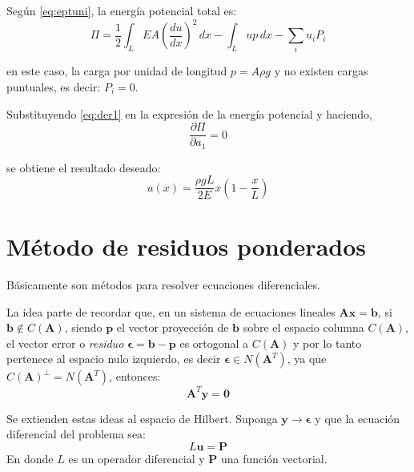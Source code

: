 \begin{example}
	Según \eqref{eq:eptuni}, la energía potencial total es:
	\begin{equation*}
		\Pi = \dfrac{1}{2} \int_L EA \left( \dfrac{du}{dx} \right)^2 \, dx - \int_L up\, dx - \sum_i u_i P_i
	\end{equation*}
	
	en este caso, la carga por unidad de longitud $p = A \rho g$ y no existen cargas puntuales, es decir: $P_i = 0$.
	
	Substituyendo \eqref{eq:der1} en la expresión de la energía potencial y haciendo,
	\begin{equation*}
		\dfrac{\partial \Pi}{\partial a_1} = 0 
	\end{equation*}
	
	
	se obtiene el resultado deseado:
	\begin{equation}
		u(x) = \dfrac{\rho g L}{2E} x \left(1 - \dfrac{x}{L}\right)
		\label{eq:rr2}
	\end{equation}
\end{example}

\section{Método de residuos ponderados}

Básicamente son métodos para resolver ecuaciones diferenciales.

La idea parte de recordar que, en un sistema de ecuaciones lineales $\mathbf{Ax} = \mathbf{b}$, si $\mathbf{b} \not \in C(\mathbf{A})$, siendo $\mathbf{p}$ el vector proyección de $\mathbf{b}$ sobre el espacio columna $C(\mathbf{A})$, el vector error o \textit{residuo} $\bm{\epsilon} = \mathbf{b} - \mathbf{p}$ es ortogonal a $C(\mathbf{A})$ y por lo tanto pertenece al espacio nulo izquierdo, es decir $\bm{\epsilon} \in N(\mathbf{A}^T)$, ya que $C(\mathbf{A})^{\perp} = N(\mathbf{A}^T)$, entonces:
\begin{equation}
	\mathbf{A}^T \mathbf{y} = \mathbf{0}
	\label{eq:residuo}
\end{equation}

Se extienden estas ideas al espacio de Hilbert. Suponga $\mathbf{y} \rightarrow \bm{\epsilon}$ y que la ecuación diferencial del problema sea:
\begin{equation}
	L \mathbf{u} = \mathbf{P}
	\label{eq:LuP}
\end{equation}
En donde $L$ es un operador diferencial y $\mathbf{P}$ una función vectorial.

